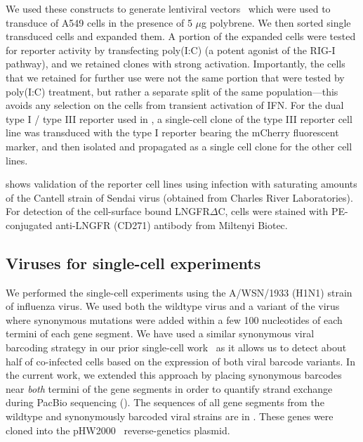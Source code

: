 \documentclass[9pt,lineno]{elife}
\begin{document}
We used these constructs to generate lentiviral vectors~\citep{oconnell2010lentiviral} which were used to transduce of A549 cells in the presence of 5 $\mu$g polybrene.
We then sorted single transduced cells and expanded them.
A portion of the expanded cells were tested for reporter activity by transfecting poly(I:C) (a potent agonist of the RIG-I pathway), and we retained clones with strong activation.
Importantly, the cells that we retained for further use were not the same portion that were tested by poly(I:C) treatment, but rather a separate split of the same population---this avoids any selection on the cells from transient activation of IFN.
For the dual type I / type III reporter used in , a single-cell clone of the type III reporter cell line was transduced with the type I reporter bearing the mCherry fluorescent marker, and then isolated and propagated as a single cell clone for the other cell lines.

 shows validation of the reporter cell lines using infection with saturating amounts of the Cantell strain of Sendai virus (obtained from Charles River Laboratories).
For detection of the cell-surface bound LNGFR$\Delta$C, cells were stained with PE-conjugated anti-LNGFR (CD271) antibody from Miltenyi Biotec.

\subsection{Viruses for single-cell experiments}
We performed the single-cell experiments using the A/WSN/1933 (H1N1) strain of influenza virus.
We used both the wildtype virus and a variant of the virus where synonymous mutations were added within a few 100 nucleotides of each termini of each gene segment.
We have used a similar synonymous viral barcoding strategy in our prior single-cell work~\citep{russell2018extreme} as it allows us to detect about half of co-infected cells based on the expression of both viral barcode variants.
In the current work, we extended this approach by placing synonymous barcodes near \emph{both} termini of the gene segments in order to quantify strand exchange during PacBio sequencing ().
The sequences of all gene segments from the wildtype and synonymously barcoded viral strains are in .
These genes were cloned into the pHW2000~\citep{hoffmann2000dna} reverse-genetics plasmid.
\end{document}
